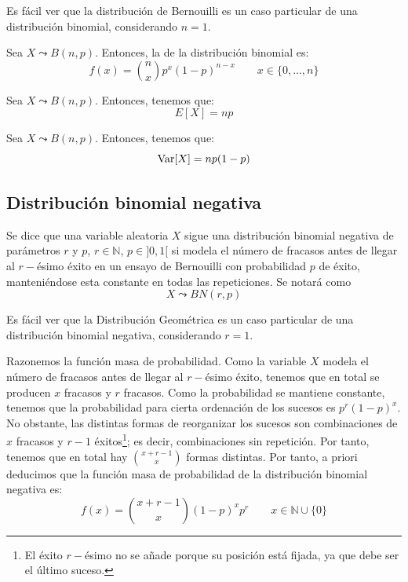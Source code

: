\begin{observacion}
    Es fácil ver que la distribución de Bernouilli es un caso particular de una distribución binomial, considerando $n=1$.
\end{observacion}

\begin{prop}
    Sea $X\leadsto B(n,p)$. Entonces, la  de la distribución binomial es:
    \begin{equation*}
        f(x) = \binom{n}{x}p^x (1-p)^{n-x} \qquad x\in \{0,\dots,n\}
    \end{equation*}
\end{prop}

\begin{prop}
    Sea $X\leadsto B(n,p)$. Entonces, tenemos que:
    \begin{equation*}
        E[X] = np
    \end{equation*}
\end{prop}

\begin{prop}
    Sea $X\leadsto B(n,p)$. Entonces, tenemos que:
    \begin{equation*}
        \operatorname{Var}[X] = np(1-p)
    \end{equation*}
\end{prop}

\subsection{Distribución binomial negativa}
\begin{definicion}
    Se dice que una variable aleatoria $X$ sigue una distribución binomial negativa de parámetros $r$ y $p$, $r\in \mathbb{N}$, $p\in ]0,1[$ si modela el número de fracasos antes de llegar al $r-$ésimo éxito en un ensayo de Bernouilli con probabilidad $p$ de éxito, manteniéndose esta constante en todas las repeticiones. Se notará como $$X\leadsto BN(r,p)$$
\end{definicion}
\begin{observacion}
    Es fácil ver que la Distribución Geométrica es un caso particular de una distribución binomial negativa, considerando $r=1$.
\end{observacion}

Razonemos la función masa de probabilidad. Como la variable $X$ modela el número de fracasos antes de llegar al $r-$ésimo éxito, tenemos que en total se producen $x$ fracasos y $r$ fracasos. Como la probabilidad se mantiene constante, tenemos que la probabilidad para cierta ordenación de los sucesos es $p^r(1-p)^{x}$. No obstante, las distintas formas de reorganizar los sucesos son combinaciones de $x$ fracasos y $r-1$ éxitos\footnote{El éxito $r-$ésimo no se añade porque su posición está fijada, ya que debe ser el último suceso.}; es decir, combinaciones sin repetición. Por tanto, tenemos que en total hay $\binom{x+r-1}{x}$ formas distintas. Por tanto, a priori deducimos que la función masa de probabilidad de la distribución binomial negativa es:
\begin{equation*}
    f(x) = \binom{x+r-1}{x}(1-p)^{x}p^r \qquad x\in \mathbb{N}\cup \{0\}
\end{equation*}

